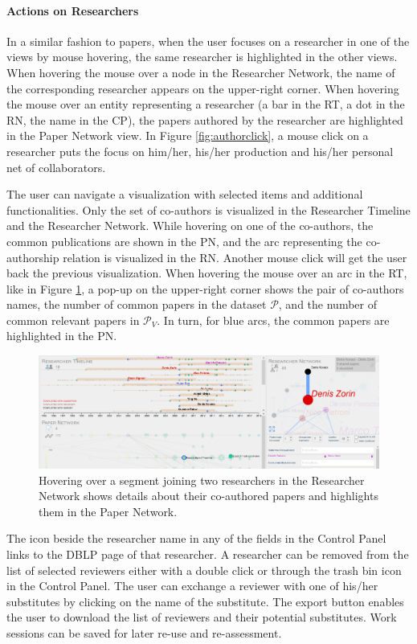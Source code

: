 \paragraph*{Actions on Researchers} In a similar fashion to papers, when the user focuses on a researcher in one of the views by mouse hovering, the same researcher is highlighted in the other views. When hovering the mouse over a node in the Researcher Network, the name of the corresponding researcher appears on the upper-right corner.  
When hovering the mouse over an entity representing a researcher (a bar in the RT, a dot in the RN, the name in the CP), the papers authored by the researcher are highlighted in the Paper Network view. 
In Figure \ref{fig:authorclick}, a mouse click on a researcher puts the focus on him/her, his/her production and his/her personal net of collaborators. 

The user can navigate a visualization with selected items and additional functionalities. Only the set of co-authors is visualized in the Researcher Timeline and the Researcher Network. While hovering on one of the co-authors, the common publications are shown in the PN, and the arc representing the co-authorship relation is visualized in the RN. Another mouse click will get the user back the previous visualization.
When hovering the mouse over an arc in the RT, like in Figure \ref{fig:researchernetwork}, a pop-up on the upper-right corner shows the pair of co-authors names, the number of common papers in the dataset $\mathcal{P}$, and the number of common relevant papers in $\mathcal{P}_{V}$. In turn, for blue arcs, the common papers are highlighted in the PN. 

\begin{figure}[!ht]
    \centering
    \includegraphics[width=\textwidth]{fig/researchernetwork.png}
    \caption{Hovering over a segment joining two researchers in the Researcher Network shows details about their co-authored papers and highlights them in the Paper Network.}
    \label{fig:researchernetwork}
\end{figure}

The icon beside the researcher name in any of the fields in the Control Panel links to the DBLP page of that researcher. 
A researcher can be removed from the list of selected reviewers either with a double click or through the trash bin icon in the Control Panel. The user can exchange a reviewer with one of his/her substitutes by clicking on the name of the substitute.
The export button enables the user to download the list of reviewers and their potential substitutes. Work sessions can be saved for later re-use and re-assessment. 